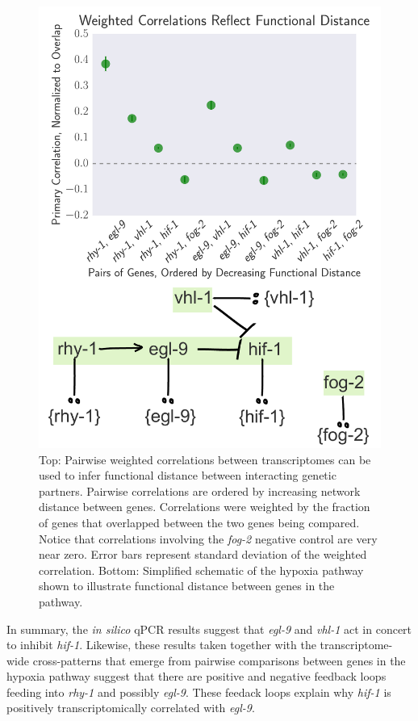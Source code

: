 \documentclass[9pt,twocolumn,twoside]{pnas-new}
\newcommand{\egl}{\emph{egl-9}}
\newcommand{\rhy}{\emph{rhy-1}}
\newcommand{\vhl}{\emph{vhl-1}}
\newcommand{\hif}{\emph{hif-1}}
\newcommand{\fog}{\emph{fog-2}}
\begin{document}
\begin{figure}[tbhp]
\centering
\includegraphics[width=\linewidth]{figs/functional_distance.pdf}
\caption{Top: Pairwise weighted correlations between transcriptomes can be used to infer functional distance between interacting genetic partners. Pairwise correlations are ordered by increasing network distance between genes. Correlations were weighted by the fraction of genes that overlapped between the two genes being compared. Notice that correlations involving the \fog{} negative control are very near zero. Error bars represent standard deviation of the weighted correlation. Bottom: Simplified schematic of the hypoxia pathway shown to illustrate functional distance between genes in the pathway.}
\label{fig:decorrelation}
\end{figure}

In summary, the \emph{in silico} qPCR results suggest that \egl{} and \vhl{} act in concert to inhibit \hif{}. Likewise, these results taken together with the transcriptome-wide cross-patterns that emerge from pairwise comparisons between genes in the hypoxia pathway suggest that there are positive and negative feedback loops feeding into \rhy{} and possibly \egl{}. These feedack loops explain why \hif{} is positively transcriptomically correlated with \egl{}.
\end{document}
